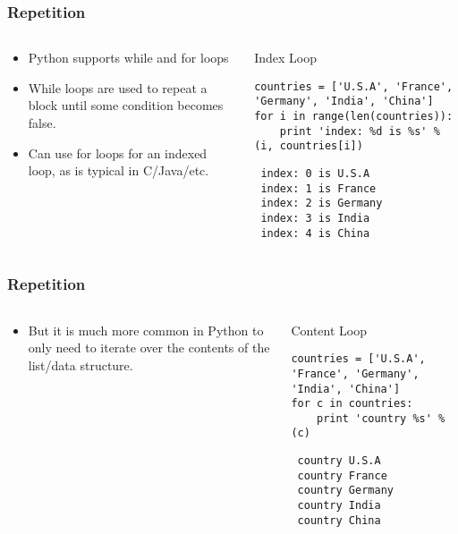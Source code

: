 \documentclass[bigger]{beamer}
\begin{document}
\begin{frame}[fragile]
\frametitle{Repetition}
\label{sec-1-10}
\begin{columns}
\begin{column}{0.4\textwidth}
\label{sec-1-10-1}

\begin{itemize}
\item Python supports while and for loops
\item While loops are used to repeat a block until some condition becomes false.
\item Can use for loops for an indexed loop, as is typical in C/Java/etc.
\end{itemize}
\end{column}
\begin{column}{0.6\textwidth}
\begin{block}{Index Loop}
\label{sec-1-10-2}

\fontsize{6}{7.2}\selectfont

\begin{verbatim}
countries = ['U.S.A', 'France', 'Germany', 'India', 'China']
for i in range(len(countries)):
    print 'index: %d is %s' % (i, countries[i])
\end{verbatim}

\begin{verbatim}
 index: 0 is U.S.A
 index: 1 is France
 index: 2 is Germany
 index: 3 is India
 index: 4 is China
\end{verbatim}
\end{block}
\end{column}
\end{columns}
\end{frame}
\begin{frame}[fragile]
\frametitle{Repetition}
\label{sec-1-11}
\begin{columns}
\begin{column}{0.4\textwidth}
\label{sec-1-11-1}

\begin{itemize}
\item But it is much more common in Python to only need to iterate
     over the contents of the list/data structure.
\end{itemize}
\end{column}
\begin{column}{0.6\textwidth}
\begin{block}{Content Loop}
\label{sec-1-11-2}

\fontsize{6}{7.2}\selectfont

\begin{verbatim}
countries = ['U.S.A', 'France', 'Germany', 'India', 'China']
for c in countries:
    print 'country %s' % (c)
\end{verbatim}

\begin{verbatim}
 country U.S.A
 country France
 country Germany
 country India
 country China
\end{verbatim}
\end{block}
\end{column}
\end{columns}
\end{frame}
\end{document}
